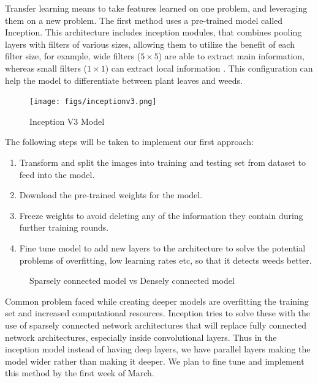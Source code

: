 \documentclass{report}
\begin{document}
Transfer learning means to take features learned on one problem, and leveraging them on a new problem. The first method uses a pre-trained model called Inception. This architecture includes inception modules, that combines pooling layers with filters of various sizes, allowing them to utilize the benefit of each filter size, for example, wide filters ($5 \times 5$) are able to extract main information, whereas small filters ($1 \times 1$) can extract local information \cite{szegedy2016rethinking}. This configuration can help the model to differentiate between plant leaves and weeds.


\begin{figure}[h]
    \centering
    \texttt{[image: figs/inceptionv3.png]}
    \caption{Inception V3 Model \cite{szegedy2016rethinking}}
    \label{fig:compute}
\end{figure}

The following steps will be taken to implement our first approach:
\begin{enumerate}
	\item Transform and split the images into training and testing set  from dataset to feed into the model. 
	\item Download the pre-trained weights for the model.
	\item Freeze weights to avoid deleting any of the information they contain during further training rounds.  
	\item Fine tune model to add new layers to the architecture to solve the potential problems of overfitting, low learning rates etc, so that it detects weeds better.

\end{enumerate}
\begin{figure}[h]
    \centering
    \qquad
    \caption{Sparsely connected model vs Densely connected model}%
    \label{fig:Arch1_Tr3}%
\end{figure}

Common problem faced while creating deeper models are overfitting the training set and increased computational resources. Inception tries to solve these with the use of sparsely connected network architectures that will replace fully connected network architectures, especially inside convolutional layers. Thus in the inception model instead of having deep layers, we have parallel layers making the model wider rather than making it deeper. We plan to fine tune and implement this method by the first week of March.
\end{document}
